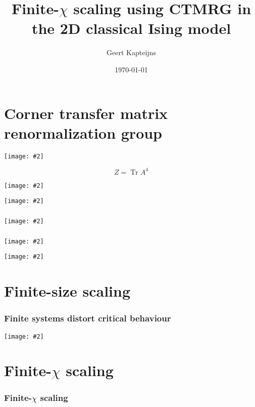 \documentclass{beamer}
\title{Finite-$\chi$ scaling using CTMRG in the 2D classical Ising model}
\date{\today}
\author{Geert Kapteijns}
\DeclareMathOperator{\tr}{Tr}
\newcommand{\includeproper}[2][0.8]{\texttt{[image: \#2]}}
\begin{document}
\maketitle

\section{Corner transfer matrix renormalization group}

\begin{frame}
  \includeproper[0.6]{ctm_tensor_network.png}

  \begin{equation*}
    Z = \tr A^4
  \end{equation*}
\end{frame}

\begin{frame}
  \includeproper[]{ctm_renormalization_step.png}
\end{frame}

\begin{frame}
  \includeproper[]{ctm_reduced_density_matrix.png}
\end{frame}

\begin{frame}
  \frametitle{\cite{baxter1982exactly_ctm}}
  \includeproper[]{baxter_truncated_equations.png}
\end{frame}

\begin{frame}
  \frametitle{\cite{baxter1978variational, baxter1968dimers}}
  \includeproper[]{baxter_mps.png}
\end{frame}

\begin{frame}
  \includeproper[]{baxter_free_energy.png}
\end{frame}



\section{Finite-size scaling}

\begin{frame}
  \frametitle{Finite systems distort critical behaviour}
  \includeproper[]{order_parameter_vs_T_N8-24_exact.pdf}
\end{frame}

\section{Finite-$\chi$ scaling}

\begin{frame}
  \frametitle{Finite-$\chi$ scaling}
  


\end{frame}


\begin{frame}[allowframebreaks]
  \printbibliography
\end{frame}
\end{document}
